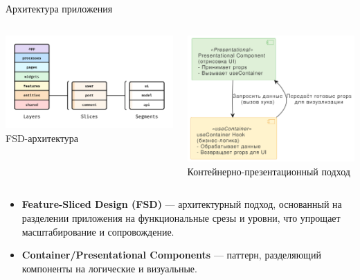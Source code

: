 \documentclass[aspectratio=169]{beamer}
\begin{document}
\begin{frame}{Архитектура приложения}
\begin{columns}
    \begin{column}{0.45\textwidth}
        \centering
        \includegraphics[width=0.8\linewidth]{static/fsd-diagram.png} \\
        \small FSD-архитектура
    \end{column}
    \begin{column}{0.45\textwidth}
        \centering
        \includegraphics[width=0.8\linewidth]{static/container-presentational.png} \\
        \small Контейнерно-презентационный подход
    \end{column}
\end{columns}

\vspace{1em}

\small
\begin{itemize}
  \item \textbf{Feature-Sliced Design (FSD)} — архитектурный подход, основанный на разделении приложения на функциональные срезы и уровни, что упрощает масштабирование и сопровождение.
  \item \textbf{Container/Presentational Components} — паттерн, разделяющий компоненты на логические и визуальные.
\end{itemize}

\end{frame}
\end{document}

